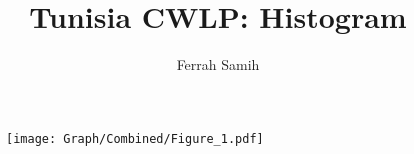 \documentclass[10pt,a4paper]{article}
\begin{document}
\author{Ferrah Samih}\title{Tunisia CWLP: Histogram}\maketitle
\pagebreak
\listoffigures
\pagebreak
\section{}
\begin{table}[H]\centering

\end{table}
\begin{figure}[H]\centering
\texttt{[image: Graph/Combined/Figure\_1.pdf]}
\caption{} \label{fig:Fig_1}
\end{figure}
\begin{table}[H]\centering

\end{table}
\usepackage[latin1]{inputenc}
\usepackage{amsmath}
\usepackage{amsfonts}
\usepackage{amssymb}
\usepackage{graphicx}
\usepackage{stata}
\usepackage{float}
\usepackage{caption}
\usepackage{setspace}
\usepackage{pdflscape}
\usepackage{hyperref}
\hypersetup{
colorlinks,
citecolor=black,
filecolor=black,
linkcolor=black,
urlcolor=black
}
\usepackage{longtable}
\end{document}

